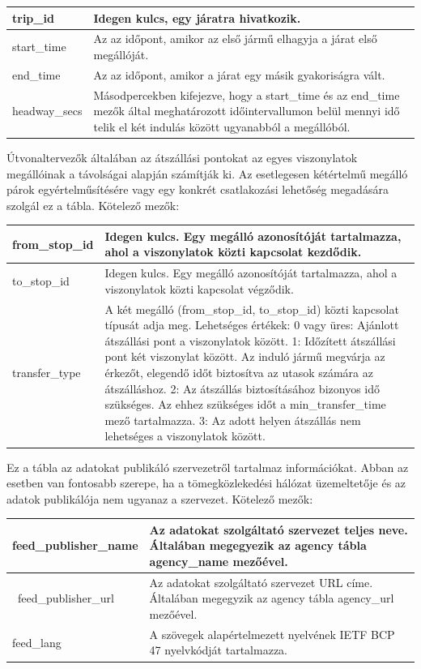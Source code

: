 \begin{tabular}{|p{3cm}|p{10cm}|}
\hline
trip\_id & Idegen kulcs, egy járatra hivatkozik. \\
\hline
start\_time & Az az időpont, amikor az első jármű elhagyja a járat első megállóját. \\
\hline
end\_time & Az az időpont, amikor a járat egy másik gyakoriságra vált. \\
\hline
headway\_secs & Másodpercekben kifejezve, hogy a start\_time és az end\_time mezők által meghatározott időintervallumon belül mennyi idő telik el két indulás között ugyanabból a megállóból. \\
\hline
\end{tabular}


Útvonaltervezők általában az átszállási pontokat az egyes viszonylatok megállóinak a távolságai alapján számítják ki. Az esetlegesen kétértelmű megálló párok egyértelműsítésére vagy egy konkrét csatlakozási lehetőség megadására szolgál ez a tábla.
Kötelező mezők:

\begin{tabular}{|p{3cm}|p{10cm}|}
\hline
from\_stop\_id & Idegen kulcs. Egy megálló azonosítóját tartalmazza, ahol a viszonylatok közti kapcsolat kezdődik.  \\
\hline
to\_stop\_id & Idegen kulcs. Egy megálló azonosítóját tartalmazza, ahol a viszonylatok közti kapcsolat végződik. \\
\hline
transfer\_type & A két megálló (from\_stop\_id, to\_stop\_id) közti kapcsolat típusát adja meg.
Lehetséges értékek:
0 vagy üres: Ajánlott átszállási pont a viszonylatok között.
1: Időzített átszállási pont két viszonylat között. Az induló jármű megvárja az érkezőt, elegendő időt biztosítva az utasok számára az átszálláshoz.
2: Az átszállás biztosításához bizonyos idő szükséges. Az ehhez szükséges időt a min\_transfer\_time mező tartalmazza.
3: Az adott helyen átszállás nem lehetséges a viszonylatok között. \\
\hline
\end{tabular}


Ez a tábla az adatokat publikáló szervezetről tartalmaz információkat. Abban az esetben van fontosabb szerepe, ha a tömegközlekedési hálózat üzemeltetője és az adatok publikálója nem ugyanaz a szervezet.
Kötelező mezők:

\begin{tabular}{|p{3cm}|p{10cm}|}
\hline
feed\_publisher\_name & Az adatokat szolgáltató szervezet teljes neve. Általában megegyezik az agency tábla agency\_name mezőével. \\
\hline\
feed\_publisher\_url & Az adatokat szolgáltató szervezet URL címe. Általában megegyzik az agency tábla agency\_url mezőével. \\
\hline
feed\_lang & A szövegek alapértelmezett nyelvének IETF BCP 47 nyelvkódját tartalmazza. \\
\hline
\end{tabular}

